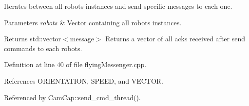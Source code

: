 Iterates between all robots instances and send specific messages to each one. 


\begin{DoxyParams}{Parameters}
{\em robots} & Vector containing all robots instances. \\
\hline
\end{DoxyParams}
\begin{DoxyReturn}{Returns}
std\+::vector$<$message$>$ Returns a vector of all acks received after send commands to each robots. 
\end{DoxyReturn}


Definition at line 40 of file flying\+Messenger.\+cpp.



References O\+R\+I\+E\+N\+T\+A\+T\+I\+ON, S\+P\+E\+ED, and V\+E\+C\+T\+OR.



Referenced by Cam\+Cap\+::send\+\_\+cmd\+\_\+thread().


